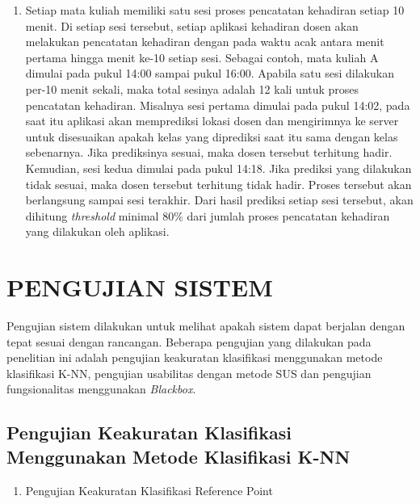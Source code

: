 \begin{enumerate}[a.]
\begin{enumerate}[1.]
\begin{lstlisting}[label=programKNNDosen]
    \end{lstlisting}

	\item Setiap mata kuliah memiliki satu sesi proses pencatatan kehadiran setiap 10 menit. Di setiap sesi tersebut, setiap aplikasi kehadiran dosen akan melakukan pencatatan kehadiran dengan pada waktu acak antara menit pertama hingga menit ke-10 setiap sesi. Sebagai contoh, mata kuliah A dimulai pada pukul 14:00 sampai pukul 16:00. Apabila satu sesi dilakukan per-10 menit sekali, maka total sesinya adalah 12 kali untuk proses pencatatan kehadiran. Misalnya sesi pertama dimulai pada pukul 14:02, pada saat itu aplikasi akan memprediksi lokasi dosen dan mengirimnya ke server untuk disesuaikan apakah kelas yang diprediksi saat itu sama dengan kelas sebenarnya. Jika prediksinya sesuai, maka dosen tersebut terhitung hadir. Kemudian, sesi kedua dimulai pada pukul 14:18. Jika prediksi yang dilakukan tidak sesuai, maka dosen tersebut terhitung tidak hadir. Proses tersebut akan berlangsung sampai sesi terakhir. Dari hasil prediksi setiap sesi tersebut, akan dihitung \textit{threshold} minimal 80\% dari jumlah proses pencatatan kehadiran yang dilakukan oleh aplikasi.
\end{enumerate}

\section{\uppercase{PENGUJIAN SISTEM}}
\par Pengujian sistem dilakukan untuk melihat apakah sistem dapat berjalan dengan tepat sesuai dengan rancangan. Beberapa pengujian yang dilakukan pada penelitian ini adalah pengujian keakuratan klasifikasi menggunakan metode klasifikasi K-NN, pengujian usabilitas dengan metode SUS dan pengujian fungsionalitas menggunakan \textit{Blackbox}.

\subsection{Pengujian Keakuratan Klasifikasi Menggunakan Metode Klasifikasi K-NN}
\begin{enumerate}

	\item Pengujian Keakuratan Klasifikasi Reference Point


\end{enumerate}
\end{enumerate}

